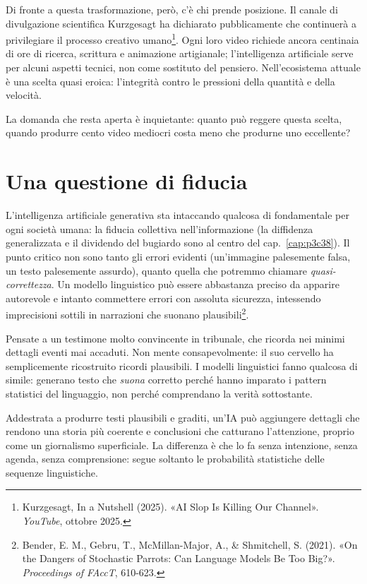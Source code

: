 Di fronte a questa trasformazione, però, c'è chi prende posizione. Il canale di divulgazione scientifica Kurzgesagt ha dichiarato pubblicamente che continuerà a privilegiare il processo creativo umano\footnote{Kurzgesagt, In a Nutshell (2025). «AI Slop Is Killing Our Channel». \textit{YouTube}, ottobre 2025.}. Ogni loro video richiede ancora centinaia di ore di ricerca, scrittura e animazione artigianale; l'intelligenza artificiale serve per alcuni aspetti tecnici, non come sostituto del pensiero. Nell'ecosistema attuale è una scelta quasi eroica: l'integrità contro le pressioni della quantità e della velocità.

La domanda che resta aperta è inquietante: quanto può reggere questa scelta, quando produrre cento video mediocri costa meno che produrne uno eccellente?

\section{Una questione di fiducia}

L'intelligenza artificiale generativa sta intaccando qualcosa di fondamentale per ogni società umana: la fiducia collettiva nell'informazione (la diffidenza generalizzata e il dividendo del bugiardo sono al centro del cap.~\ref{cap:p3c38}). Il punto critico non sono tanto gli errori evidenti (un'immagine palesemente falsa, un testo palesemente assurdo), quanto quella che potremmo chiamare \textit{quasi-correttezza}. Un modello linguistico può essere abbastanza preciso da apparire autorevole e intanto commettere errori con assoluta sicurezza, intessendo imprecisioni sottili in narrazioni che suonano plausibili\footnote{Bender, E. M., Gebru, T., McMillan-Major, A., \& Shmitchell, S. (2021). «On the Dangers of Stochastic Parrots: Can Language Models Be Too Big?». \textit{Proceedings of FAccT}, 610-623.}.

Pensate a un testimone molto convincente in tribunale, che ricorda nei minimi dettagli eventi mai accaduti. Non mente consapevolmente: il suo cervello ha semplicemente ricostruito ricordi plausibili. I modelli linguistici fanno qualcosa di simile: generano testo che \textit{suona} corretto perché hanno imparato i pattern statistici del linguaggio, non perché comprendano la verità sottostante.


Addestrata a produrre testi plausibili e graditi, un'IA può aggiungere dettagli che rendono una storia più coerente e conclusioni che catturano l'attenzione, proprio come un giornalismo superficiale. La differenza è che lo fa senza intenzione, senza agenda, senza comprensione: segue soltanto le probabilità statistiche delle sequenze linguistiche.

